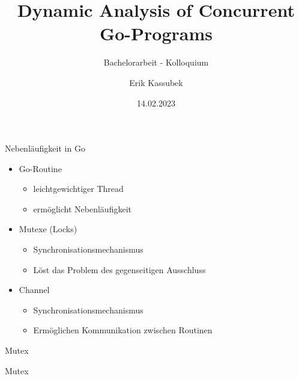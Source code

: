 \documentclass[aspectratio=169]{beamer}  %
\author[Erik Kassubek]{Erik Kassubek}
\title[Dynamic Analysis of Concurrent Go-Programs]{Dynamic Analysis of Concurrent Go-Programs}
\subtitle{Bachelorarbeit - Kolloquium}
\institute[]{Institut für Informatik\\Albert-Ludwigs-Universität Freiburg}
\date{14.02.2023}
\begin{document}
\frame{
    \titlepage
}



\begin{frame}{Nebenläufigkeit in Go}
    \begin{itemize}
      \item Go-Routine
      \begin{itemize}
        \item leichtgewichtiger Thread
        \item ermöglicht Nebenläufigkeit
      \end{itemize}
      \item Mutexe (Locks)
      \begin{itemize}
        \item Synchronisationsmechanismus
        \item Löst das Problem des gegenseitigen Ausschluss
      \end{itemize}
      \item Channel
      \begin{itemize}
        \item Synchronisationsmechanismus
        \item Ermöglichen Kommunikation zwischen Routinen
      \end{itemize}
    \end{itemize}
\end{frame}


\begin{frame}{Mutex}
  \begin{minipage}{0.49\textwidth}
    
  \end{minipage}
  \hfill
  \hfill
  \begin{minipage}{0.49\textwidth}
  \end{minipage}
\end{frame}

\begin{frame}{Mutex}
  \begin{minipage}[t]{0.49\textwidth}
    
  \end{minipage}
  \hfill
  \hfill
  \begin{minipage}[t]{0.49\textwidth}
  \end{minipage}
\end{frame}
\end{document}
